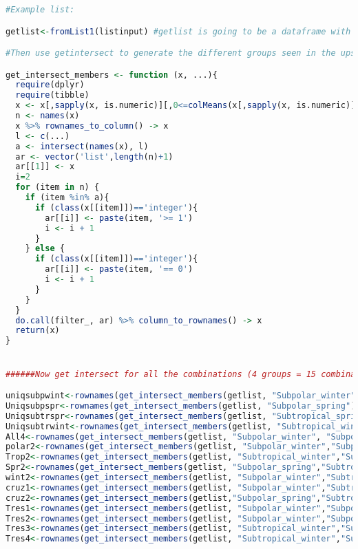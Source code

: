 \documentclass{article}
\begin{document}
\begin{lstlisting}[language=R,caption={N1N2figscripts}]
#Example list:

getlist<-fromList1(listinput) #getlist is going to be a dataframe with 1 and 0s

#Then use getintersect to generate the different groups seen in the upsetR plot

get_intersect_members <- function (x, ...){
  require(dplyr)
  require(tibble)
  x <- x[,sapply(x, is.numeric)][,0<=colMeans(x[,sapply(x, is.numeric)],na.rm=T) & colMeans(x[,sapply(x, is.numeric)],na.rm=T)<=1]
  n <- names(x)
  x %>% rownames_to_column() -> x
  l <- c(...)
  a <- intersect(names(x), l)
  ar <- vector('list',length(n)+1)
  ar[[1]] <- x
  i=2
  for (item in n) {
    if (item %in% a){
      if (class(x[[item]])=='integer'){
        ar[[i]] <- paste(item, '>= 1')
        i <- i + 1
      }
    } else {
      if (class(x[[item]])=='integer'){
        ar[[i]] <- paste(item, '== 0')
        i <- i + 1
      }
    }
  }
  do.call(filter_, ar) %>% column_to_rownames() -> x
  return(x)
}


######Now get intersect for all the combinations (4 groups = 15 combinations)########

uniqsubpwint<-rownames(get_intersect_members(getlist, "Subpolar_winter"))
Uniqsubpspr<-rownames(get_intersect_members(getlist, "Subpolar_spring"))
Uniqsubtrspr<-rownames(get_intersect_members(getlist, "Subtropical_spring"))
Uniqsubtrwint<-rownames(get_intersect_members(getlist, "Subtropical_winter"))
All4<-rownames(get_intersect_members(getlist, "Subpolar_winter", "Subpolar_spring", "Subtropical_spring", "Subtropical_winter"))
polar2<-rownames(get_intersect_members(getlist, "Subpolar_winter","Subpolar_spring"))
Trop2<-rownames(get_intersect_members(getlist, "Subtropical_winter","Subtropical_spring"))
Spr2<-rownames(get_intersect_members(getlist, "Subpolar_spring","Subtropical_spring"))
wint2<-rownames(get_intersect_members(getlist, "Subpolar_winter","Subtropical_winter"))
cruz1<-rownames(get_intersect_members(getlist, "Subpolar_winter","Subtropical_spring"))
cruz2<-rownames(get_intersect_members(getlist,"Subpolar_spring","Subtropical_winter"))
Tres1<-rownames(get_intersect_members(getlist, "Subpolar_winter","Subpolar_spring", "Subtropical_winter"))
Tres2<-rownames(get_intersect_members(getlist, "Subpolar_winter","Subpolar_spring", "Subtropical_spring"))
Tres3<-rownames(get_intersect_members(getlist, "Subtropical_winter","Subtropical_spring","Subpolar_winter"))
Tres4<-rownames(get_intersect_members(getlist, "Subtropical_winter","Subtropical_spring","Subpolar_spring"))


\end{lstlisting}
\end{document}
